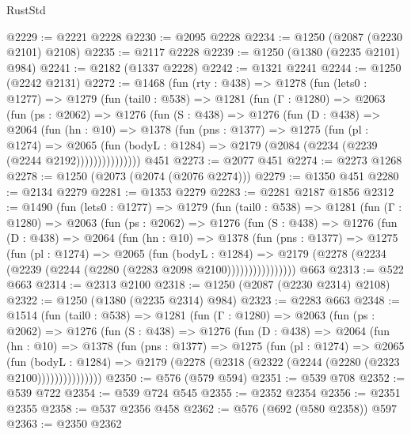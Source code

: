 \begin{lexlean}{RustStd}
\begin{coremodule}
{\begin{coremodule}
{{{{{{{{{{{{{@2229 := @2221 @2228
@2230 := @2095 @2228
@2234 := @1250 (@2087 (@2230 @2101) @2108)
@2235 := @2117 @2228
@2239 := @1250 (@1380 (@2235 @2101) @984)
@2241 := @2182 (@1337 @2228)
@2242 := @1321 @2241
@2244 := @1250 (@2242 @2131)
@2272 := @1468
    (fun (rty : @438) =>
    @1278
      (fun (lets0 : @1277) =>
      @1279
        (fun (tail0 : @538) =>
        @1281
          (fun (Γ : @1280) =>
          @2063
            (fun (ps : @2062) =>
            @1276
              (fun (S : @438) =>
              @1276
                (fun (D : @438) =>
                @2064
                  (fun (hn : @10) =>
                  @1378
                    (fun (pns : @1377) =>
                    @1275
                      (fun (pl : @1274) =>
                      @2065
                        (fun (bodyL : @1284) =>
                        @2179 (@2084 (@2234 (@2239 (@2244 @2192)))))))))))))))
    @451
@2273 := @2077 @451
@2274 := @2273 @1268
@2278 := @1250 (@2073 (@2074 (@2076 @2274)))
@2279 := @1350 @451
@2280 := @2134 @2279
@2281 := @1353 @2279
@2283 := @2281 @2187 @1856
@2312 := @1490
    (fun (lets0 : @1277) =>
    @1279
      (fun (tail0 : @538) =>
      @1281
        (fun (Γ : @1280) =>
        @2063
          (fun (ps : @2062) =>
          @1276
            (fun (S : @438) =>
            @1276
              (fun (D : @438) =>
              @2064
                (fun (hn : @10) =>
                @1378
                  (fun (pns : @1377) =>
                  @1275
                    (fun (pl : @1274) =>
                    @2065
                      (fun (bodyL : @1284) =>
                      @2179 (@2278 (@2234 (@2239 (@2244 (@2280 (@2283 @2098 @2100))))))))))))))))
    @663
@2313 := @522 @663
@2314 := @2313 @2100
@2318 := @1250 (@2087 (@2230 @2314) @2108)
@2322 := @1250 (@1380 (@2235 @2314) @984)
@2323 := @2283 @663
@2348 := @1514
    (fun (tail0 : @538) =>
    @1281
      (fun (Γ : @1280) =>
      @2063
        (fun (ps : @2062) =>
        @1276
          (fun (S : @438) =>
          @1276
            (fun (D : @438) =>
            @2064
              (fun (hn : @10) =>
              @1378
                (fun (pns : @1377) =>
                @1275
                  (fun (pl : @1274) =>
                  @2065
                    (fun (bodyL : @1284) =>
                    @2179 (@2278 (@2318 (@2322 (@2244 (@2280 (@2323 @2100)))))))))))))))
@2350 := @576 (@579 @594)
@2351 := @539 @708
@2352 := @539 @722
@2354 := @539 @724 @545
@2355 := @2352 @2354
@2356 := @2351 @2355
@2358 := @537 @2356 @458
@2362 := @576 (@692 (@580 @2358)) @597
@2363 := @2350 @2362
}}}}}}}}}}}}}
\end{coremodule}}
\end{coremodule}
\end{lexlean}
